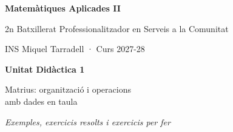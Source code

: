 \documentclass[11pt,a4paper]{article}
\begin{document}
\begin{titlepage}
\centering
\vspace*{3cm}
{\Large\bfseries\color{udnavy} Matemàtiques Aplicades II\par}
\vspace{0.4cm}
{\large 2n Batxillerat Professionalitzador en Serveis a la Comunitat\par}
\vspace{0.2cm}
{\large INS Miquel Tarradell · Curs 2027-28\par}
\vspace{2cm}
{\Huge\bfseries\color{udnavy} Unitat Didàctica 1\par}
\vspace{0.4cm}
{\LARGE Matrius: organització i operacions\\ amb dades en taula\par}
\vspace{1.5cm}
{\large\itshape Exemples, exercicis resolts i exercicis per fer\par}
\vfill
\end{titlepage}

\tableofcontents
\newpage


\newpage

\end{document}
